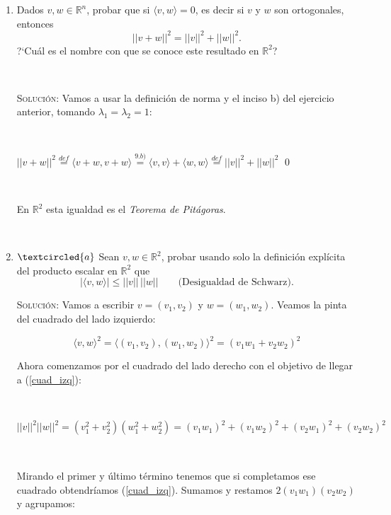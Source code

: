 \documentclass[a4paper,12pt,twoside,spanish,reqno]{amsbook}
\numberwithin{equation}{section}
\newcommand{\rta}{\noindent\textsc{Solución: }}
\begin{document}
\begin{enumerate}
\begin{enumerate}
\end{enumerate}

\

\item Dados $v, w\in \mathbb R^n$, probar que si  $\langle v , w  \rangle =0$, es decir si $v$ y $w$ son ortogonales,  entonces
	\begin{equation*}
	||v + w||^2 = ||v||^2 + ||w||^2.
	\end{equation*}
	?`Cu\'al es el nombre con que se conoce este resultado en $\mathbb R^2$?

\	
	
\rta Vamos a usar la definición de norma y el inciso b) del ejercicio anterior, tomando $\lambda_1 = \lambda_2 = 1$:

\

$||v + w||^2 \overset{def}{=} \langle v+w,v+w \rangle \overset{9.b)}{=} \langle v,v \rangle + \langle w,w \rangle \overset{def}{=} ||v||^2 + ||w||^2$ \qed

\

En $\mathbb R^2$ esta igualdad es el \emph{Teorema de Pitágoras}.

\
 
\item\label{Schwarz} $\textcircled{a}$ Sean $v,w\in \mathbb R^2$, probar usando  solo la definici\'on explícita del producto escalar en $\mathbb R^2$ que 
\begin{equation*}
	|\langle v , w  \rangle| \le ||v||\,||w|| \qquad \text{(Desigualdad de Schwarz).}
\end{equation*}

\rta Vamos a escribir $v = (v_1 , v_2)$ y $w=(w_1,w_2) $. Veamos la pinta del cuadrado del lado izquierdo:

\begin{equation}\label{cuad_izq}
\langle v,w \rangle^2 = \langle (v_1,v_2) , (w_1,w_2) \rangle^2 =  (v_1 w_1 + v_2 w_2 )^2
\end{equation}

Ahora comenzamos por el cuadrado del lado derecho con el objetivo de llegar a (\ref{cuad_izq}):

\

$ ||v||^2||w||^2 = (v_1^2 + v_2^2)(w_1^2 + w_2^2) = (v_1 w_1)^2 + (v_1 w_2)^2 + (v_2 w_1)^2 + (v_2 w_2)^2$

\

Mirando el primer y último término tenemos que si completamos ese cuadrado obtendríamos (\ref{cuad_izq}). Sumamos y restamos $2(v_1w_1)(v_2w_2)$ y agrupamos:


\end{enumerate}
\end{document}
